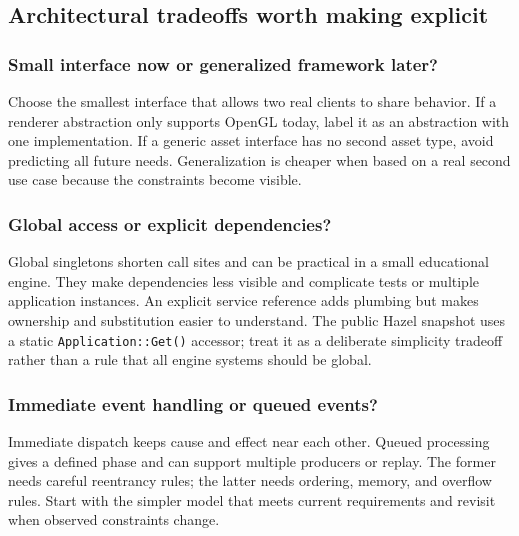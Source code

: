 \subsection{Architectural tradeoffs worth making explicit}\label{06-engine-ii-ch041-architectural-tradeoffs-worth-making-explicit}

\subsubsection{Small interface now or generalized framework later?}\label{06-engine-ii-ch041-small-interface-now-or-generalized-framework-later}

Choose the smallest interface that allows two real clients to share behavior. If a renderer abstraction only supports OpenGL today, label it as an abstraction with one implementation. If a generic asset interface has no second asset type, avoid predicting all future needs. Generalization is cheaper when based on a real second use case because the constraints become visible.

\subsubsection{Global access or explicit dependencies?}\label{06-engine-ii-ch041-global-access-or-explicit-dependencies}

Global singletons shorten call sites and can be practical in a small educational engine. They make dependencies less visible and complicate tests or multiple application instances. An explicit service reference adds plumbing but makes ownership and substitution easier to understand. The public Hazel snapshot uses a static \texttt{Application::Get()} accessor; treat it as a deliberate simplicity tradeoff rather than a rule that all engine systems should be global.

\subsubsection{Immediate event handling or queued events?}\label{06-engine-ii-ch041-immediate-event-handling-or-queued-events}

Immediate dispatch keeps cause and effect near each other. Queued processing gives a defined phase and can support multiple producers or replay. The former needs careful reentrancy rules; the latter needs ordering, memory, and overflow rules. Start with the simpler model that meets current requirements and revisit when observed constraints change.

